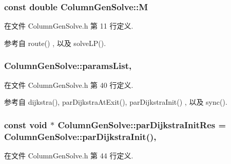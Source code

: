 \subsubsection[{\texorpdfstring{M}{M}}]{\setlength{\rightskip}{0pt plus 5cm}const double Column\+Gen\+Solve\+::M}\hypertarget{classColumnGenSolve_ac5abb4d6dfd291b01af6ea006b5f9f5d}{}\label{classColumnGenSolve_ac5abb4d6dfd291b01af6ea006b5f9f5d}


在文件 Column\+Gen\+Solve.\+h 第 11 行定义.



参考自 route() , 以及 solve\+L\+P().

\subsubsection[{\texorpdfstring{params\+List}{paramsList}}]{ Column\+Gen\+Solve\+::params\+List\hspace{0.3cm}{\ttfamily [static]}, {\ttfamily [protected]}}\hypertarget{classColumnGenSolve_aba2e5f0dc752db74718e834faf9ef606}{}\label{classColumnGenSolve_aba2e5f0dc752db74718e834faf9ef606}


在文件 Column\+Gen\+Solve.\+h 第 40 行定义.



参考自 dijkstra(), par\+Dijkstra\+At\+Exit(), par\+Dijkstra\+Init() , 以及 sync().

\subsubsection[{\texorpdfstring{par\+Dijkstra\+Init\+Res}{parDijkstraInitRes}}]{\setlength{\rightskip}{0pt plus 5cm}const void $\ast$ Column\+Gen\+Solve\+::par\+Dijkstra\+Init\+Res = {\bf Column\+Gen\+Solve\+::par\+Dijkstra\+Init}()\hspace{0.3cm}{\ttfamily [static]}, {\ttfamily [protected]}}\hypertarget{classColumnGenSolve_ac77eb4def69a3476015487be8a49818a}{}\label{classColumnGenSolve_ac77eb4def69a3476015487be8a49818a}


在文件 Column\+Gen\+Solve.\+h 第 44 行定义.

